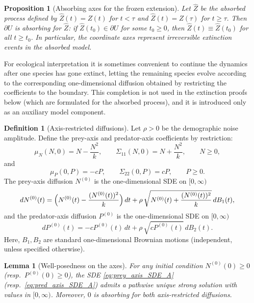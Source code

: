 \documentclass[pdflatex,sn-mathphys-ay]{sn-jnl}
\theoremstyle{thmstyleone}
\newtheorem{proposition}[theorem]{Proposition}
\newtheorem{lemma}[theorem]{Lemma}
\theoremstyle{definition}
\newtheorem{definition}[theorem]{Definition}
\theoremstyle{remark}
\begin{document}
\begin{proposition}[Absorbing axes for the frozen extension]\label{prop:axes_absorbing_frozen_A}
Let $\widehat Z$ be the absorbed process defined by $\widehat Z(t)=Z(t)$ for $t<\tau$ and
$\widehat Z(t)=Z(\tau)$ for $t\ge \tau$. Then $\partial U$ is absorbing for $\widehat Z$:
if $\widehat Z(t_0)\in\partial U$ for some $t_0\ge 0$, then $\widehat Z(t)\equiv \widehat Z(t_0)$ for all $t\ge t_0$.
In particular, the coordinate axes represent irreversible extinction events in the absorbed model.
\end{proposition}

For ecological interpretation it is sometimes convenient to continue the dynamics after one species has gone
extinct, letting the remaining species evolve according to the corresponding one-dimensional diffusion obtained by
restricting the coefficients to the boundary. This completion is not used in the extinction proofs below
(which are formulated for the absorbed process), and it is introduced only as an auxiliary model component.

\begin{definition}[Axis-restricted diffusions]\label{def:axis_restricted_diffusions_A}
Let $\rho>0$ be the demographic noise amplitude. Define the prey-axis and predator-axis coefficients by restriction:
\[
\mu_N(N,0)=N-\frac{N^2}{k},\qquad
\Sigma_{11}(N,0)=N+\frac{N^2}{k},\qquad N\ge 0,
\]
and
\[
\mu_P(0,P)=-cP,\qquad
\Sigma_{22}(0,P)=cP,\qquad P\ge 0.
\]
The prey-axis diffusion $N^{(0)}$ is the one-dimensional SDE on $[0,\infty)$
\begin{equation}\label{eq:prey_axis_SDE_A}
dN^{(0)}(t)=\Bigl(N^{(0)}(t)-\frac{(N^{(0)}(t))^2}{k}\Bigr)\,dt
+\rho\,\sqrt{N^{(0)}(t)+\frac{(N^{(0)}(t))^2}{k}}\,dB_1(t),
\end{equation}
and the predator-axis diffusion $P^{(0)}$ is the one-dimensional SDE on $[0,\infty)$
\begin{equation}\label{eq:pred_axis_SDE_A}
dP^{(0)}(t)=-cP^{(0)}(t)\,dt+\rho\,\sqrt{cP^{(0)}(t)}\,dB_2(t).
\end{equation}
Here, $B_1,B_2$ are standard one-dimensional Brownian motions (independent, unless specified otherwise).
\end{definition}

\begin{lemma}[Well-posedness on the axes]\label{lem:axis_wellposedness_A}
For any initial condition $N^{(0)}(0)\ge 0$ (resp.\ $P^{(0)}(0)\ge 0$), the SDE \eqref{eq:prey_axis_SDE_A}
(resp.\ \eqref{eq:pred_axis_SDE_A}) admits a pathwise unique strong solution with values in $[0,\infty)$.
Moreover, $0$ is absorbing for both axis-restricted diffusions.
\end{lemma}
\end{document}
